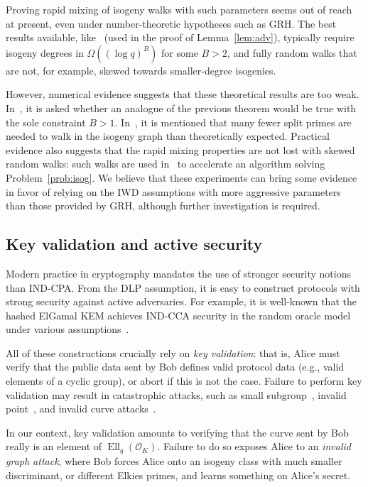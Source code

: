 \documentclass{llncs}
\renewcommand{\O}{\mathcal{O}}
\DeclareMathOperator{\Ell}{Ell}
\begin{document}
Proving rapid mixing of isogeny walks with such
parameters seems out of reach at present, even under number-theoretic
hypotheses such as GRH. The best results available,
like~\cite[Theorem~1.5]{jao+miller+venkatesan09}
(used in the proof of Lemma~\ref{lem:adv}),
typically require isogeny degrees in $\Omega((\log q)^B)$
for some $B>2$, and fully random walks that are not,
for example, skewed towards smaller-degree isogenies.

However, numerical evidence suggests that
these theoretical results are too weak. In~\cite[7.2]{jao+miller+venkatesan09},
it is asked whether an analogue of the previous theorem would
be true with the sole constraint $B>1$. In~\cite[Section~3]{GHS},
it is mentioned that many fewer split primes are needed to walk
in the isogeny graph than theoretically expected.
Practical evidence also suggests that the rapid mixing
properties are not lost with skewed random walks:
such walks are used in~\cite{galbraith+stolbunov11}
to accelerate an algorithm solving Problem~\ref{prob:isog}.
We believe that these experiments can bring some evidence
in favor of relying on the IWD assumptions with more aggressive
parameters than those provided by GRH, although further investigation
is required.


\subsection{Key validation and active security}
\label{sec:validation}

Modern practice in cryptography mandates the use of stronger security
notions than IND-CPA.  From the DLP assumption, it is easy to
construct protocols with strong security against active adversaries.
For example, it is well-known that the hashed ElGamal KEM achieves
IND-CCA security in the random oracle model under various
assumptions~\cite{10.1007/3-540-45353-9_12,cryptoeprint:1999:007,doi:10.1137/S0097539702403773}.

All of these constructions crucially rely on \emph{key validation}:
that is, Alice must verify that the public data sent by Bob defines valid
protocol data (e.g., valid elements of a cyclic group), or abort if
this is not the case.
Failure to perform key validation may result in catastrophic attacks,
such as small subgroup~\cite{10.1007/BFb0052240}, invalid
point~\cite{10.1007/3-540-44598-6_8}, and invalid curve
attacks~\cite{Ciet2005}.  

In our context, key validation amounts to
verifying that the curve sent by Bob really is an element of
$\Ell_q(\O_K)$. Failure to do so exposes Alice to an \emph{invalid
  graph attack}, where Bob forces Alice onto an isogeny class with much
smaller discriminant, or different Elkies primes, and learns something
on Alice's secret.
\end{document}
